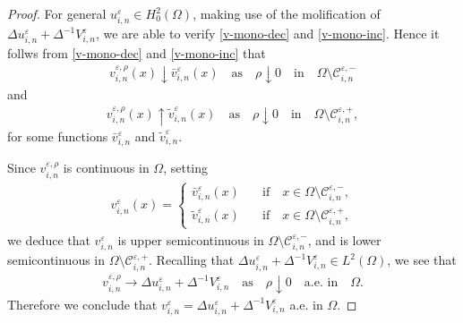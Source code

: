 \documentclass[12pt]{amsart}
\begin{document}
\begin{proof}
For general $u^{\varepsilon}_{i,n} \in H^{2}_{0}(\Omega)$, making use of the molification of $\Delta u^{\varepsilon}_{i,n} + \Delta^{-1} V^{\varepsilon}_{i,n}$, 
we are able to verify \eqref{v-mono-dec} and \eqref{v-mono-inc}. 
Hence it follws from \eqref{v-mono-dec} and \eqref{v-mono-inc} that 
\begin{align*}
v^{{\varepsilon},\rho}_{i,n}(x) \downarrow \bar{v}^{\varepsilon}_{i,n}(x) 
\quad \text{as} \quad \rho \downarrow 0 \quad \text{in} \quad \Omega \setminus {\mathcal{C}}^{{\varepsilon},-}_{i,n}
\end{align*}
and 
\begin{align*}
v^{{\varepsilon},\rho}_{i,n}(x) \uparrow \tilde{v}^{\varepsilon}_{i,n}(x) 
\quad \text{as} \quad \rho \downarrow 0 \quad \text{in} \quad \Omega \setminus {\mathcal{C}}^{{\varepsilon},+}_{i,n},
\end{align*}
for some functions $\bar{v}^{\varepsilon}_{i,n}$ and $\tilde{v}^{\varepsilon}_{i,n}$. 

Since $v^{{\varepsilon},\rho}_{i,n}$ is continuous in $\Omega$, setting 
\begin{align*}
v^{\varepsilon}_{i,n}(x) = 
\begin{cases}
\bar{v}^{\varepsilon}_{i,n}(x) \quad & \text{if} \quad x \in \Omega \setminus {\mathcal{C}}^{{\varepsilon},-}_{i,n}, \\
\tilde{v}^{\varepsilon}_{i,n}(x) \quad & \text{if} \quad x \in \Omega \setminus {\mathcal{C}}^{{\varepsilon},+}_{i,n},
\end{cases}
\end{align*}
we deduce that $v^{\varepsilon}_{i,n}$ is upper semicontinuous in $\Omega \setminus {\mathcal{C}}^{{\varepsilon},-}_{i,n}$, and 
is lower semicontinuous in $\Omega \setminus {\mathcal{C}}^{{\varepsilon},+}_{i,n}$. 
Recalling that $\Delta u^{\varepsilon}_{i,n} + \Delta^{-1} V^{\varepsilon}_{i,n} \in L^{2}(\Omega)$, we see that 
\begin{align*}
v^{{\varepsilon},\rho}_{i,n} \to \Delta u^{\varepsilon}_{i,n} + \Delta^{-1} V^{\varepsilon}_{i,n} \quad \text{as} \quad \rho \downarrow 0 \quad \text{a.e. in} \quad \Omega. 
\end{align*}
Therefore we conclude that $v^{\varepsilon}_{i,n}= \Delta u^{\varepsilon}_{i,n} + \Delta^{-1} V^{\varepsilon}_{i,n}$ a.e. in $\Omega$. 
\end{proof}
\end{document}
